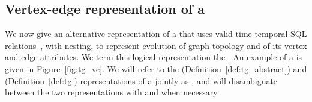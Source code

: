 \subsection{Vertex-edge representation of a \tg}
\label{sec:model:ve}

We now give an alternative representation of a \tg that uses
valid-time temporal SQL relations~\cite{DBLP:conf/vldb/BohlenSS96},
with nesting, to represent evolution of graph topology and of its
vertex and edge attributes.  We term this logical representation the
{\em \ve \tg}.  An example of a \ve \tg is given in
Figure~\ref{fig:tg_ve}.  We will refer to the \rgs
(Definition~\ref{def:tg_abstract}) and \ve (Definition~\ref{def:tg})
representations of a \tg jointly as , and will disambiguate
between the two representations with \trg and \tve when necessary.


